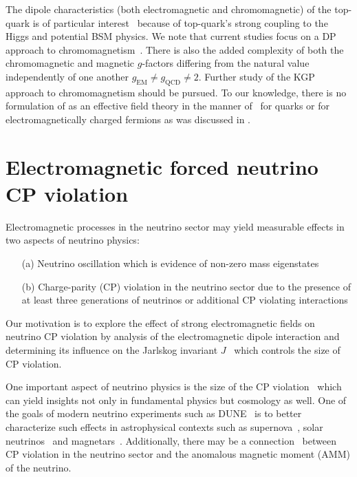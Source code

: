 The dipole characteristics (both electromagnetic and chromomagnetic) of the top-quark is of particular interest~\citep{Labun:2012fg,Vryonidou:2018eyv} because of top-quark's strong coupling to the Higgs and potential BSM physics. We note that current studies focus on a DP approach to chromomagnetism~\citep{Zhang:2010dr,Zhang:2012muc,BuarqueFranzosi:2015jrv}. There is also the added complexity of both the chromomagnetic and magnetic $g$-factors differing from the natural value independently of one another $g_\mathrm{EM}\neq g_\mathrm{QCD}\neq2$. Further study of the KGP approach to chromomagnetism should be pursued. To our knowledge, there is no formulation of  as an effective field theory in the manner of~\cite{Fleming:2000ib,Bauer:2000yr} for quarks or for electromagnetically charged fermions as was discussed in .


\section{Electromagnetic forced neutrino CP violation}
\label{sec:nucp}
Electromagnetic processes in the neutrino sector may yield measurable effects in two aspects of neutrino physics: 
\begin{itemize}[nosep]
    \item[(a)] Neutrino oscillation which is evidence of non-zero mass eigenstates
    \item[(b)] Charge-parity (CP) violation in the neutrino sector due to the presence of at least three generations of neutrinos or additional CP violating interactions
\end{itemize}
Our motivation is to explore the effect of strong electromagnetic fields on neutrino CP violation by analysis of the electromagnetic dipole interaction and determining its influence on the Jarlskog invariant $J$~\citep{Jarlskog:1985ht,Jarlskog:1985cw,Jarlskog:2004be} which controls the size of CP violation.

One important aspect of neutrino physics is the size of the CP violation~\citep{Xing:2000ik,giunti2007fundamentals,Huber:2022lpm} which can yield insights not only in fundamental physics but cosmology as well. One of the goals of modern neutrino experiments such as DUNE~\cite{DUNE:2020jqi} is to better characterize such effects in astrophysical contexts such as supernova~\citep{DUNE:2020zfm,SajjadAthar:2021prg}, solar neutrinos~\citep{Akhmedov:2022txm} and magnetars~\citep{Lichkunov:2020zzx}. Additionally, there may be a connection~\citep{Pehlivan:2014zua,Balaji:2019fxd,Balaji:2020oig} between CP violation in the neutrino sector and the anomalous magnetic moment (AMM) of the neutrino.

